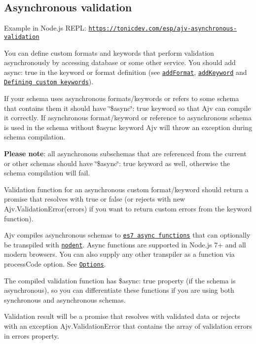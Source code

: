 \subsection*{Asynchronous validation}

Example in Node.\+js R\+E\+PL\+: \href{https://tonicdev.com/esp/ajv-asynchronous-validation}{\tt https\+://tonicdev.\+com/esp/ajv-\/asynchronous-\/validation}

You can define custom formats and keywords that perform validation asynchronously by accessing database or some other service. You should add {\ttfamily async\+: true} in the keyword or format definition (see \href{#api-addformat}{\tt add\+Format}, \href{#api-addkeyword}{\tt add\+Keyword} and \href{#defining-custom-keywords}{\tt Defining custom keywords}).

If your schema uses asynchronous formats/keywords or refers to some schema that contains them it should have {\ttfamily \char`\"{}\$async\char`\"{}\+: true} keyword so that Ajv can compile it correctly. If asynchronous format/keyword or reference to asynchronous schema is used in the schema without {\ttfamily \$async} keyword Ajv will throw an exception during schema compilation.

{\bfseries Please note}\+: all asynchronous subschemas that are referenced from the current or other schemas should have {\ttfamily \char`\"{}\$async\char`\"{}\+: true} keyword as well, otherwise the schema compilation will fail.

Validation function for an asynchronous custom format/keyword should return a promise that resolves with {\ttfamily true} or {\ttfamily false} (or rejects with {\ttfamily new Ajv.\+Validation\+Error(errors)} if you want to return custom errors from the keyword function).

Ajv compiles asynchronous schemas to \href{http://tc39.github.io/ecmascript-asyncawait/}{\tt es7 async functions} that can optionally be transpiled with \href{https://github.com/MatAtBread/nodent}{\tt nodent}. Async functions are supported in Node.\+js 7+ and all modern browsers. You can also supply any other transpiler as a function via {\ttfamily process\+Code} option. See \href{#options}{\tt Options}.

The compiled validation function has {\ttfamily \$async\+: true} property (if the schema is asynchronous), so you can differentiate these functions if you are using both synchronous and asynchronous schemas.

Validation result will be a promise that resolves with validated data or rejects with an exception {\ttfamily Ajv.\+Validation\+Error} that contains the array of validation errors in {\ttfamily errors} property.


